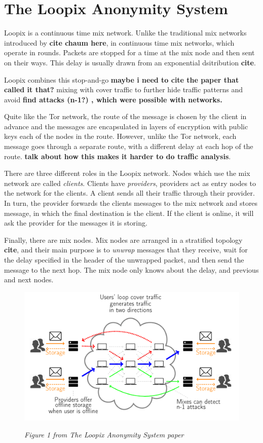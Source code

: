 \documentclass[a4paper,11pt,oneside]{report}
\begin{document}
\section{The Loopix Anonymity System}
Loopix is a continuous time mix network. Unlike the traditional mix networks introduced by \textbf{cite chaum here}, in continuous time mix networks, which operate in rounds. Packets are stopped for a time at the mix node and then sent on their ways. This delay is usually drawn from an exponential dsitribution \textbf{cite}.

Loopix combines this stop-and-go \textbf{maybe i need to cite the paper that called it that?} mixing with cover traffic to further hide traffic patterns and avoid \textbf{find attacks (n-1?) , which were possible with  networks.}

Quite like the Tor network, the route of the message is chosen by the client in advance and the messages are encapsulated in layers of encryption with public keys each of the nodes in the route. However, unlike the Tor network, each message goes through a separate route, with a different delay at each hop of the route. \textbf{talk about how this makes it harder to do traffic analysis}.

There are three different roles in the Loopix network. Nodes which use the mix network are called \textit{clients}. Clients have \textit{providers}, providers act as entry nodes to the network for the clients. A client sends all their traffic through their provider. In turn, the provider forwards the clients messages to the mix network and stores message, in which the final destination is the client. If the client is online, it will ask the provider for the messages it is storing.

Finally, there are mix nodes. Mix nodes are arranged in a stratified topology \textbf{cite}, and their main purpose is to \textit{unwrap} messages that they receive, wait for the delay specified in the header of the unwrapped packet, and then send the message to the next hop. The mix node only knows about the delay, and previous and next nodes.

\begin{figure}[H]
    \centering
    \includegraphics[width=0.8\linewidth]{plots/loopix.png}
    \caption{}
    \label{fig:loopix}
    \small\textit{Figure 1 from The Loopix Anonymity System paper}
\end{figure}
\end{document}
